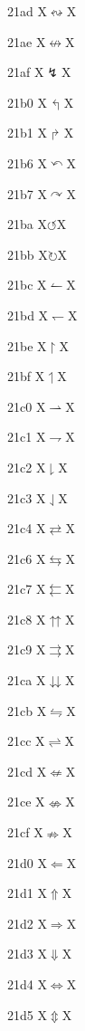 \documentclass[11pt]{article}
\begin{document}
21ad X{\ensuremath{\leftrightsquigarrow}}X

21ae X{\ensuremath{\nleftrightarrow}}X

21af X{\ensuremath{\lightning}}X

21b0 X{\ensuremath{\Lsh}}X

21b1 X{\ensuremath{\Rsh}}X

21b6 X{\ensuremath{\curvearrowleft}}X

21b7 X{\ensuremath{\curvearrowright}}X

21ba X{\ensuremath{\circlearrowleft}}X

21bb X{\ensuremath{\circlearrowright}}X

21bc X{\ensuremath{\leftharpoonup}}X

21bd X{\ensuremath{\leftharpoondown}}X

21be X{\ensuremath{\upharpoonright}}X

21bf X{\ensuremath{\upharpoonleft}}X

21c0 X{\ensuremath{\rightharpoonup}}X

21c1 X{\ensuremath{\rightharpoondown}}X

21c2 X{\ensuremath{\downharpoonright}}X

21c3 X{\ensuremath{\downharpoonleft}}X

21c4 X{\ensuremath{\rightleftarrows}}X

21c6 X{\ensuremath{\leftrightarrows}}X

21c7 X{\ensuremath{\leftleftarrows}}X

21c8 X{\ensuremath{\upuparrows}}X

21c9 X{\ensuremath{\rightrightarrows}}X

21ca X{\ensuremath{\downdownarrows}}X

21cb X{\ensuremath{\leftrightharpoons}}X

21cc X{\ensuremath{\rightleftharpoons}}X

21cd X{\ensuremath{\nLeftarrow}}X

21ce X{\ensuremath{\nLeftrightarrow}}X

21cf X{\ensuremath{\nRightarrow}}X

21d0 X{\ensuremath{\Leftarrow}}X

21d1 X{\ensuremath{\Uparrow}}X

21d2 X{\ensuremath{\Rightarrow}}X

21d3 X{\ensuremath{\Downarrow}}X

21d4 X{\ensuremath{\Leftrightarrow}}X

21d5 X{\ensuremath{\Updownarrow}}X
\end{document}

